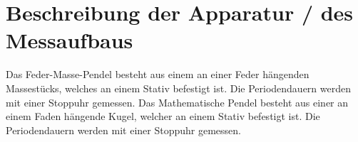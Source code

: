 \section{Beschreibung der Apparatur / des Messaufbaus}
Das Feder-Masse-Pendel besteht aus einem an einer Feder hängenden Massestücks, welches an einem Stativ befestigt ist. Die Periodendauern werden mit einer Stoppuhr gemessen. 
\newline
\newline
Das Mathematische Pendel besteht aus einer an einem Faden hängende Kugel, welcher an einem Stativ befestigt ist. Die Periodendauern werden mit einer Stoppuhr gemessen.
\pagebreak